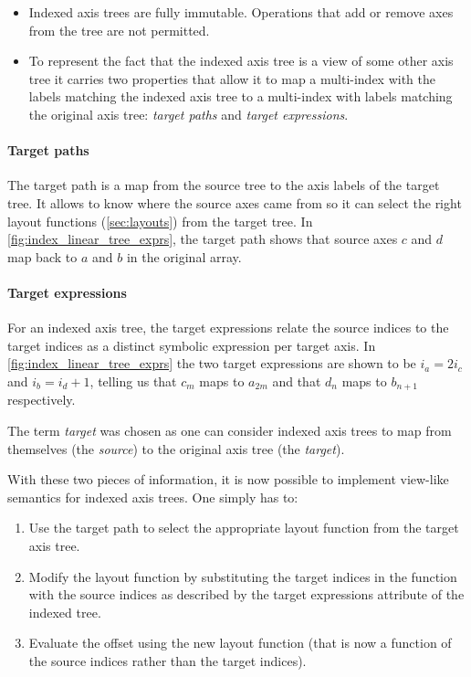 \documentclass[thesis]{subfiles}
\begin{document}
\begin{itemize}
  \item
    Indexed axis trees are fully immutable.
    Operations that add or remove axes from the tree are not permitted.

  \item
    To represent the fact that the indexed axis tree is a view of some other axis tree it carries two properties that allow it to map a multi-index with the labels matching the indexed axis tree to a multi-index with labels matching the original axis tree: \textit{target paths} and \textit{target expressions}.
\end{itemize}


\paragraph{Target paths}

The target path is a map from the source tree to the axis labels of the target tree.
It allows  to know where the source axes came from so it can select the right layout functions (\cref{sec:layouts}) from the target tree.
In \cref{fig:index_linear_tree_exprs}, the target path shows that source axes $c$ and $d$ map back to $a$ and $b$ in the original array.

\paragraph{Target expressions}

For an indexed axis tree, the target expressions relate the source indices to the target indices as a distinct symbolic expression per target axis.
In \cref{fig:index_linear_tree_exprs} the two target expressions are shown to be $i_a = 2 i_c$ and $i_b = i_d + 1$, telling us that $c_m$ maps to $a_{2m}$ and that $d_n$ maps to $b_{n+1}$ respectively.

The term \textit{target} was chosen as one can consider indexed axis trees to map from themselves (the \textit{source}) to the original axis tree (the \textit{target}).

With these two pieces of information, it is now possible to implement view-like semantics for indexed axis trees.
One simply has to:

\begin{enumerate}
  \item
    Use the target path to select the appropriate layout function from the target axis tree.
  \item
    Modify the layout function by substituting the target indices in the function with the source indices as described by the target expressions attribute of the indexed tree.
  \item
    Evaluate the offset using the new layout function (that is now a function of the source indices rather than the target indices).
\end{enumerate}
\end{document}
